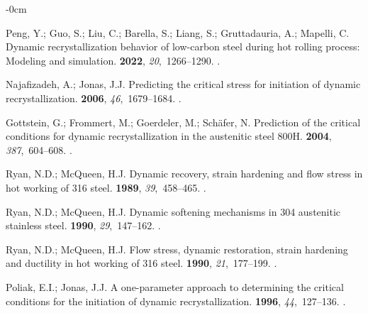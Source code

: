 \documentclass[metals,article,accept,pdftex,moreauthors]{Definitions/mdpi}
\begin{document}
\begin{adjustwidth}{-\extralength}{0cm}
\begin{thebibliography}{999}
Peng, Y.; Guo, S.; Liu, C.; Barella, S.; Liang, S.; Gruttadauria, A.; Mapelli,
  C.
\newblock Dynamic recrystallization behavior of low-carbon steel during hot
  rolling process: Modeling and simulation.
 {\bf 2022}, {\em
  20},~1266--1290.
.

Najafizadeh, A.; Jonas, J.J.
\newblock Predicting the critical stress for initiation of dynamic
  recrystallization.
 {\bf 2006}, {\em 46},~1679--1684.
.

Gottstein, G.; Frommert, M.; Goerdeler, M.; Sch{\"a}fer, N.
\newblock Prediction of the critical conditions for dynamic recrystallization
  in the austenitic steel 800H.
 {\bf 2004}, {\em
  387},~604--608.
.

Ryan, N.D.; McQueen, H.J.
\newblock Dynamic recovery, strain hardening and flow stress in hot working of
  316 steel.
 {\bf 1989}, {\em
  39},~458--465.
.

Ryan, N.D.; McQueen, H.J.
\newblock Dynamic softening mechanisms in 304 austenitic stainless steel.
 {\bf 1990}, {\em
  29},~147--162.
.

Ryan, N.D.; McQueen, H.J.
\newblock Flow stress, dynamic restoration, strain hardening and ductility in
  hot working of 316 steel.
 {\bf 1990}, {\em
  21},~177--199.
.

Poliak, E.I.; Jonas, J.J.
\newblock A one-parameter approach to determining the critical conditions for
  the initiation of dynamic recrystallization.
 {\bf 1996}, {\em 44},~127--136.
.


\end{thebibliography}
\end{adjustwidth}
\end{document}
